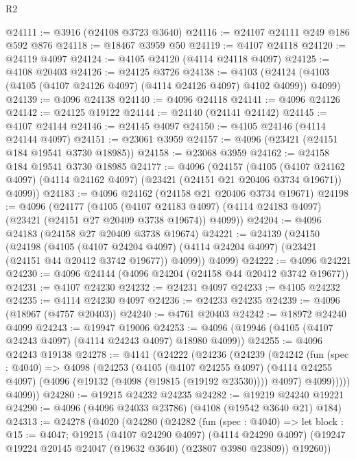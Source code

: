 \begin{lexlean}{R2}
\begin{coremodule}
@24111 := @3916 (@24108 @3723 @3640)
@24116 := @24107 @24111 @249 @186 @592 @876
@24118 := @18467 @3959 @50
@24119 := @4107 @24118
@24120 := @24119 @4097
@24124 := @4105 @24120 (@4114 @24118 @4097)
@24125 := @4108 @20403
@24126 := @24125 @3726
@24138 := @4103 (@24124 (@4103 (@4105 (@4107 @24126 @4097) (@4114 @24126 @4097) @4102 @4099)) @4099)
@24139 := @4096 @24138
@24140 := @4096 @24118
@24141 := @4096 @24126
@24142 := @24125 @19122
@24144 := @24140 (@24141 @24142)
@24145 := @4107 @24144
@24146 := @24145 @4097
@24150 := @4105 @24146 (@4114 @24144 @4097)
@24151 := @23061 @3959
@24157 := @4096 (@23421 (@24151 @184 @19541 @3730 @18985))
@24158 := @23068 @3959
@24162 := @24158 @184 @19541 @3730 @18985
@24177 := @4096
    (@24157
      (@4105
        (@4107 @24162 @4097)
        (@4114 @24162 @4097)
        (@23421 (@24151 @21 @20406 @3734 @19671))
        @4099))
@24183 := @4096 @24162 (@24158 @21 @20406 @3734 @19671)
@24198 := @4096
    (@24177
      (@4105
        (@4107 @24183 @4097)
        (@4114 @24183 @4097)
        (@23421 (@24151 @27 @20409 @3738 @19674))
        @4099))
@24204 := @4096 @24183 (@24158 @27 @20409 @3738 @19674)
@24221 := @24139
    (@24150
      (@24198
        (@4105
          (@4107 @24204 @4097)
          (@4114 @24204 @4097)
          (@23421 (@24151 @44 @20412 @3742 @19677))
          @4099))
      @4099)
@24222 := @4096 @24221
@24230 := @4096 @24144 (@4096 @24204 (@24158 @44 @20412 @3742 @19677))
@24231 := @4107 @24230
@24232 := @24231 @4097
@24233 := @4105 @24232
@24235 := @4114 @24230 @4097
@24236 := @24233 @24235
@24239 := @4096 (@18967 (@4757 @20403))
@24240 := @4761 @20403
@24242 := @18972 @24240 @4099
@24243 := @19947 @19006
@24253 := @4096 (@19946 (@4105 (@4107 @24243 @4097) (@4114 @24243 @4097) @18980 @4099))
@24255 := @4096 @24243 @19138
@24278 := @4141
    (@24222
      (@24236
        (@24239
          (@24242
            (fun (spec : @4040) =>
            @4098
              (@24253
                (@4105
                  (@4107 @24255 @4097)
                  (@4114 @24255 @4097)
                  (@4096 (@19132 (@4098 (@19815 (@19192 @23530)))) @4097)
                  @4099)))))
        @4099))
@24280 := @19215 @24232 @24235
@24282 := @19219 @24240 @19221
@24290 := @4096 (@4096 @24033 @23786) (@4108 (@19542 @3640 @21) @184)
@24313 := @24278
    (@4020
      (@24280
        (@24282
          (fun (spec : @4040) =>
          let block : @15 := @4047;
          @19215
            (@4107 @24290 @4097)
            (@4114 @24290 @4097)
            (@19247 @19224 @20145 @24047 (@19632 @3640) (@23807 @3980 @23809))
            @19260))

\end{coremodule}
\end{lexlean}
